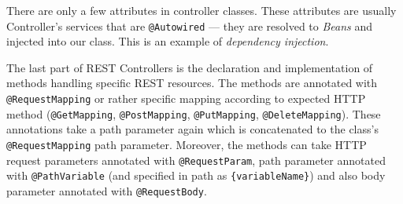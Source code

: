 There are only a few attributes in controller classes. These attributes are usually Controller's services that are \texttt{@Autowired} --- they are resolved to \emph{Beans} and injected into our class. This is an example of \emph{dependency injection}.

The last part of REST Controllers is the declaration and implementation of methods handling specific REST resources. The methods are annotated with \texttt{@RequestMapping} or rather specific mapping according to expected HTTP method (\texttt{@GetMapping}, \texttt{@PostMapping}, \texttt{@PutMapping}, \texttt{@DeleteMapping}). These annotations take a path parameter again which is concatenated to the class's \texttt{@RequestMapping} path parameter.
Moreover, the methods can take HTTP request parameters annotated with \texttt{@RequestParam}, path parameter annotated with \texttt{@PathVariable} (and specified in path as \texttt{\{variableName\}}) and also body parameter annotated with \texttt{@RequestBody}.

